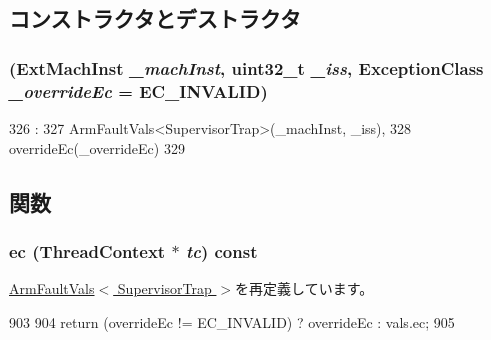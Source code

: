 \subsection{コンストラクタとデストラクタ}
\hypertarget{classArmISA_1_1SupervisorTrap_a4495049d8fb76e06d9669611708775df}{
\subsubsection[{SupervisorTrap}]{ (ExtMachInst {\em \_\-machInst}, \/  {\bf uint32\_\-t} {\em \_\-iss}, \/  {\bf ExceptionClass} {\em \_\-overrideEc} = {\ttfamily EC\_\-INVALID})}}
\label{classArmISA_1_1SupervisorTrap_a4495049d8fb76e06d9669611708775df}



\begin{DoxyCode}
326                                                             :
327         ArmFaultVals<SupervisorTrap>(_machInst, _iss),
328         overrideEc(_overrideEc)
329     {}

\end{DoxyCode}


\subsection{関数}
\hypertarget{classArmISA_1_1SupervisorTrap_aefab73b22a74d7c48b8a23230906d7cd}{
\subsubsection[{ec}]{ ec ({\bf ThreadContext} $\ast$ {\em tc}) const}}
\label{classArmISA_1_1SupervisorTrap_aefab73b22a74d7c48b8a23230906d7cd}


\hyperlink{classArmISA_1_1ArmFaultVals_aa4dd5fb47a1253dbe17e692e905a8c7c}{ArmFaultVals$<$ SupervisorTrap $>$}を再定義しています。


\begin{DoxyCode}
903 {
904     return (overrideEc != EC_INVALID) ? overrideEc : vals.ec;
905 }
\end{DoxyCode}


